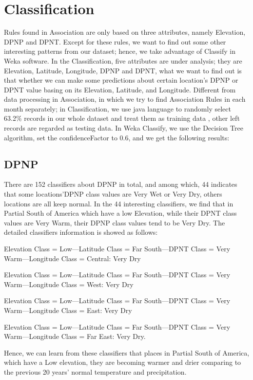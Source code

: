 \documentclass[11pt]{article}
\begin{document}
\section{Classification}
Rules found in Association are only based on three attributes, namely Elevation, DPNP and DPNT.  Except for these rules, we want to find out some other interesting patterns from our dataset; hence, we take advantage of Classify in Weka software.  In the Classification, five attributes are under analysis; they are Elevation, Latitude, Longitude, DPNP and DPNT, what we want to find out is that whether we can make some predictions about certain location\rq s DPNP or DPNT value basing on its Elevation, Latitude, and Longitude.  Different from data processing in Association, in which we try to find Association Rules in each month separately; in Classification, we use java language to randomly select 63.2\% records in our whole dataset and treat them as training data , other left records are regarded as testing data.  In Weka Classify, we use the Decision Tree algorithm, set the confidenceFactor to 0.6, and we get the following results:

\subsection{DPNP}
There are 152 classifiers about DPNP in total, and among which, 44 indicates that some locations\rq DPNP class values are Very Wet or Very Dry, others locations are all keep normal.  In the 44 interesting classifiers, we find that in Partial South of America which have a low Elevation, while their DPNT class values are Very Warm, their DPNP class values tend to be Very Dry. The detailed classifiers information is showed as follows:

Elevation Class = Low---Latitude Class = Far South---DPNT Class = Very Warm---Longitude Class = Central:  Very Dry

Elevation Class = Low---Latitude Class = Far South---DPNT Class = Very Warm---Longitude Class = West:  Very Dry

Elevation Class = Low---Latitude Class = Far South---DPNT Class = Very Warm---Longitude Class = East:  Very Dry

Elevation Class = Low---Latitude Class = Far South---DPNT Class = Very Warm---Longitude Class = Far East:  Very Dry.

Hence, we can learn from these classifiers that places in Partial South of America, which have a Low elevation, they are becoming warmer and drier comparing to the previous 20 years’ normal temperature and precipitation.
\end{document}
